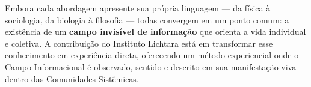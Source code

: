 Embora cada abordagem apresente sua própria linguagem — da física à sociologia, da biologia à filosofia — todas convergem em um ponto comum: a existência de um \textbf{campo invisível de informação} que orienta a vida individual e coletiva. A contribuição do Instituto Lichtara está em transformar esse conhecimento em experiência direta, oferecendo um método experiencial onde o Campo Informacional é observado, sentido e descrito em sua manifestação viva dentro das Comunidades Sistêmicas.

\newpage
